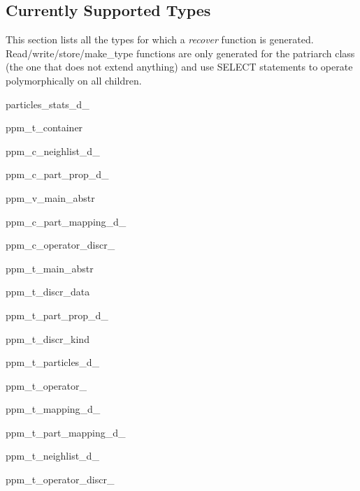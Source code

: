\documentclass{article}
\begin{document}
\begin{tabular}{p{}p{}}
\end{tabular}


\subsection{Currently Supported Types}
This section lists all the types for which a \emph{recover} function is generated. Read/write/store/make\_type functions are only generated for the patriarch class (the one that does not extend anything) and use SELECT statements to operate polymorphically on all children.
\begin{list}{}{}
\item particles\_stats\_d\_
\item ppm\_t\_container
\item ppm\_c\_neighlist\_d\_
\item ppm\_c\_part\_prop\_d\_
\item ppm\_v\_main\_abstr
\item ppm\_c\_part\_mapping\_d\_
\item ppm\_c\_operator\_discr\_
\item ppm\_t\_main\_abstr
\item ppm\_t\_discr\_data
\item ppm\_t\_part\_prop\_d\_
\item ppm\_t\_discr\_kind
\item ppm\_t\_particles\_d\_
\item ppm\_t\_operator\_
\item ppm\_t\_mapping\_d\_
\item ppm\_t\_part\_mapping\_d\_
\item ppm\_t\_neighlist\_d\_
\item ppm\_t\_operator\_discr\_
\end{list}
\end{document}
